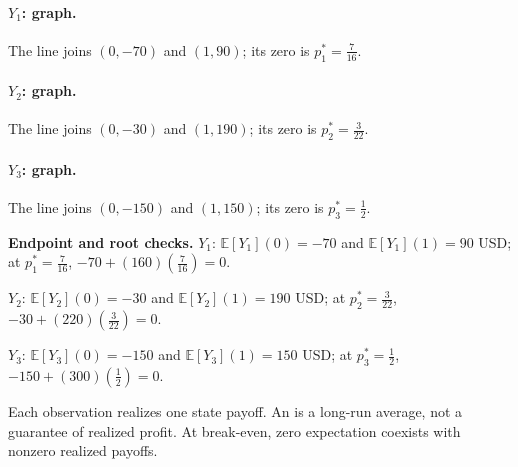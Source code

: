 \paragraph{$Y_1$: graph.}
\begin{center}\end{center}
The line joins $(0,-70)$ and $(1,90)$; its zero is $p_1^*=\frac{7}{16}$.
\clearpage
{}\paragraph{$Y_2$: graph.}
\begin{center}\end{center}
The line joins $(0,-30)$ and $(1,190)$; its zero is $p_2^*=\frac{3}{22}$.
\clearpage
{}\paragraph{$Y_3$: graph.}
\begin{center}\end{center}
The line joins $(0,-150)$ and $(1,150)$; its zero is $p_3^*=\frac{1}{2}$.

\textbf{Endpoint and root checks.} $Y_1$: $\mathbb E[Y_1](0)=-70$ and $\mathbb E[Y_1](1)=90$ USD; at $p_1^*=\frac{7}{16}$, $-70+(160)(\frac{7}{16})=0$.

$Y_2$: $\mathbb E[Y_2](0)=-30$ and $\mathbb E[Y_2](1)=190$ USD; at $p_2^*=\frac{3}{22}$, $-30+(220)(\frac{3}{22})=0$.

$Y_3$: $\mathbb E[Y_3](0)=-150$ and $\mathbb E[Y_3](1)=150$ USD; at $p_3^*=\frac{1}{2}$, $-150+(300)(\frac{1}{2})=0$.

Each observation realizes one state payoff. An  is a long-run average,
not a guarantee of realized profit. At break-even, zero expectation coexists with nonzero realized payoffs.

